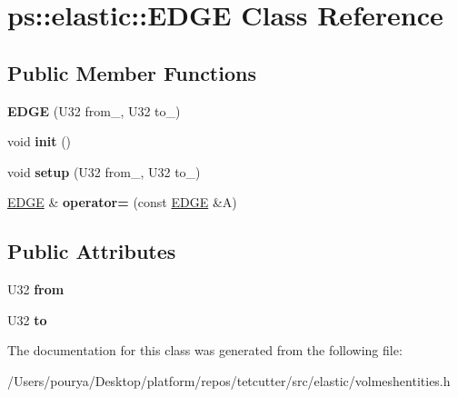 \hypertarget{classps_1_1elastic_1_1EDGE}{}\section{ps\+:\+:elastic\+:\+:E\+D\+G\+E Class Reference}
\label{classps_1_1elastic_1_1EDGE}
\subsection*{Public Member Functions}
\begin{DoxyCompactItemize}
\item 
\hypertarget{classps_1_1elastic_1_1EDGE_a7a17a2d3e5d307164a5e4ace0705a3ce}{}{\bfseries E\+D\+G\+E} (U32 from\+\_\+, U32 to\+\_\+)\label{classps_1_1elastic_1_1EDGE_a7a17a2d3e5d307164a5e4ace0705a3ce}

\item 
\hypertarget{classps_1_1elastic_1_1EDGE_a7c8d8f8da508cea1a05bb529b42c1467}{}void {\bfseries init} ()\label{classps_1_1elastic_1_1EDGE_a7c8d8f8da508cea1a05bb529b42c1467}

\item 
\hypertarget{classps_1_1elastic_1_1EDGE_aaad75706e275d2161084c72d5b87ee9f}{}void {\bfseries setup} (U32 from\+\_\+, U32 to\+\_\+)\label{classps_1_1elastic_1_1EDGE_aaad75706e275d2161084c72d5b87ee9f}

\item 
\hypertarget{classps_1_1elastic_1_1EDGE_a6db7916e4af6523ebdb74f32f9edc943}{}\hyperlink{classps_1_1elastic_1_1EDGE}{E\+D\+G\+E} \& {\bfseries operator=} (const \hyperlink{classps_1_1elastic_1_1EDGE}{E\+D\+G\+E} \&A)\label{classps_1_1elastic_1_1EDGE_a6db7916e4af6523ebdb74f32f9edc943}

\end{DoxyCompactItemize}
\subsection*{Public Attributes}
\begin{DoxyCompactItemize}
\item 
\hypertarget{classps_1_1elastic_1_1EDGE_a7879567b21f23c188bc9915d04b1015d}{}U32 {\bfseries from}\label{classps_1_1elastic_1_1EDGE_a7879567b21f23c188bc9915d04b1015d}

\item 
\hypertarget{classps_1_1elastic_1_1EDGE_accd00008f498d0110a35df7152203db6}{}U32 {\bfseries to}\label{classps_1_1elastic_1_1EDGE_accd00008f498d0110a35df7152203db6}

\end{DoxyCompactItemize}


The documentation for this class was generated from the following file\+:\begin{DoxyCompactItemize}
\item 
/\+Users/pourya/\+Desktop/platform/repos/tetcutter/src/elastic/volmeshentities.\+h\end{DoxyCompactItemize}
